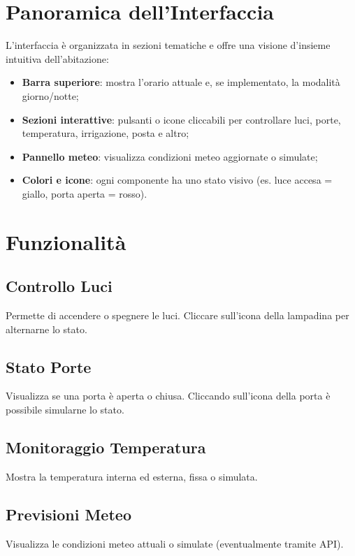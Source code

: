 \documentclass[a4paper,12pt]{article}
\begin{document}
\section{Panoramica dell’Interfaccia}

L’interfaccia è organizzata in sezioni tematiche e offre una visione d’insieme intuitiva dell’abitazione:

\begin{itemize}[noitemsep]
  \item \textbf{Barra superiore}: mostra l’orario attuale e, se implementato, la modalità giorno/notte;
  \item \textbf{Sezioni interattive}: pulsanti o icone cliccabili per controllare luci, porte, temperatura, irrigazione, posta e altro;
  \item \textbf{Pannello meteo}: visualizza condizioni meteo aggiornate o simulate;
  \item \textbf{Colori e icone}: ogni componente ha uno stato visivo (es. luce accesa = giallo, porta aperta = rosso).
\end{itemize}

\section{Funzionalità}

\subsection*{Controllo Luci}
Permette di accendere o spegnere le luci. Cliccare sull’icona della lampadina per alternarne lo stato.

\subsection*{Stato Porte}
Visualizza se una porta è aperta o chiusa. Cliccando sull’icona della porta è possibile simularne lo stato.

\subsection*{Monitoraggio Temperatura}
Mostra la temperatura interna ed esterna, fissa o simulata.

\subsection*{Previsioni Meteo}
Visualizza le condizioni meteo attuali o simulate (eventualmente tramite API).
\end{document}

